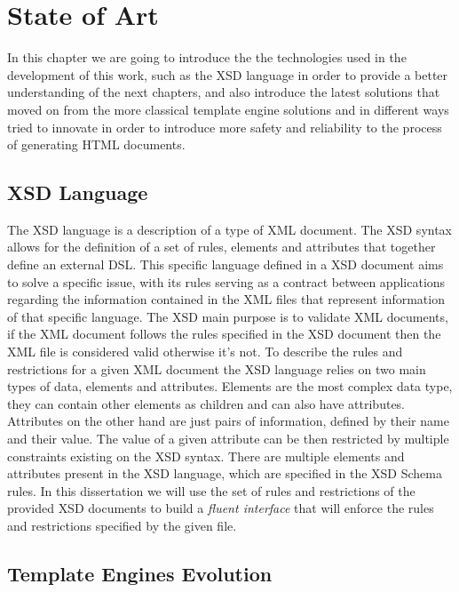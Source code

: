 \chapter{State of Art}
\label{cha:stateofart}

In this chapter we are going to introduce the the technologies used in the development of this work, such as the \ac{XSD} language in order to provide a better understanding of the next chapters, and also introduce the latest solutions that moved on from the more classical template engine solutions and in different ways tried to innovate in order to introduce more safety and reliability to the process of generating \ac{HTML} documents. 

\section{XSD Language} %
\label{sec:xsd}

The \ac{XSD} language is a description of a type of \ac{XML} document. The \ac{XSD} syntax allows for the definition of a set of rules, elements and attributes that together define an external \ac{DSL}. This specific language defined in a \ac{XSD} document aims to solve a specific issue, with its rules serving as a contract between applications regarding the information contained in the \ac{XML} files that represent information of that specific language. The \ac{XSD} main purpose is to validate \ac{XML} documents, if the \ac{XML} document follows the rules specified in the \ac{XSD} document then the \ac{XML} file is considered valid otherwise it's not. To describe the rules and restrictions for a given \ac{XML} document the \ac{XSD} language relies on two main types of data, elements and attributes. Elements are the most complex data type, they can contain other elements as children and can also have attributes. Attributes on the other hand are just pairs of information, defined by their name and their value. The value of a given attribute can be then restricted by multiple constraints existing on the \ac{XSD} syntax. There are multiple elements and attributes present in the \ac{XSD} language, which are specified in the \ac{XSD} Schema rules\cite{xsdrules}. In this dissertation we will use the set of rules and restrictions of the provided \ac{XSD} documents to build a \textit{fluent interface} that will enforce the rules and restrictions specified by the given file.

\section{Template Engines Evolution}
\label{sec:templateenginesevolution}

